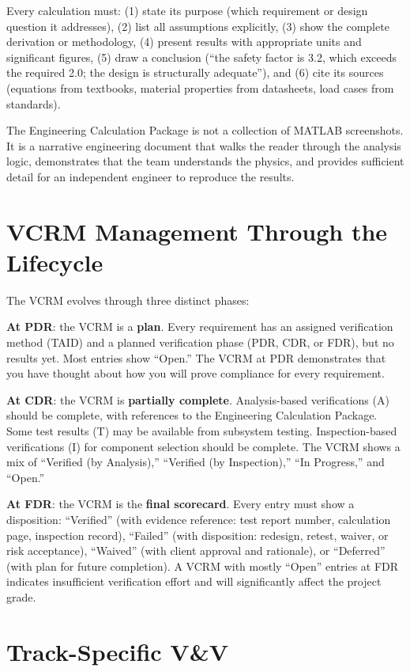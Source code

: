 Every calculation must: (1) state its purpose (which requirement or design question it addresses), (2) list all assumptions explicitly, (3) show the complete derivation or methodology, (4) present results with appropriate units and significant figures, (5) draw a conclusion (``the safety factor is 3.2, which exceeds the required 2.0; the design is structurally adequate''), and (6) cite its sources (equations from textbooks, material properties from datasheets, load cases from standards).

The Engineering Calculation Package is not a collection of MATLAB screenshots. It is a narrative engineering document that walks the reader through the analysis logic, demonstrates that the team understands the physics, and provides sufficient detail for an independent engineer to reproduce the results.

\section{VCRM Management Through the Lifecycle}
The VCRM evolves through three distinct phases:

\textbf{At PDR}: the VCRM is a \textbf{plan}. Every requirement has an assigned verification method (TAID) and a planned verification phase (PDR, CDR, or FDR), but no results yet. Most entries show ``Open.'' The VCRM at PDR demonstrates that you have thought about how you will prove compliance for every requirement.

\textbf{At CDR}: the VCRM is \textbf{partially complete}. Analysis-based verifications (A) should be complete, with references to the Engineering Calculation Package. Some test results (T) may be available from subsystem testing. Inspection-based verifications (I) for component selection should be complete. The VCRM shows a mix of ``Verified (by Analysis),'' ``Verified (by Inspection),'' ``In Progress,'' and ``Open.''

\textbf{At FDR}: the VCRM is the \textbf{final scorecard}. Every entry must show a disposition: ``Verified'' (with evidence reference: test report number, calculation page, inspection record), ``Failed'' (with disposition: redesign, retest, waiver, or risk acceptance), ``Waived'' (with client approval and rationale), or ``Deferred'' (with plan for future completion). A VCRM with mostly ``Open'' entries at FDR indicates insufficient verification effort and will significantly affect the project grade.

\section{Track-Specific V\&V}

